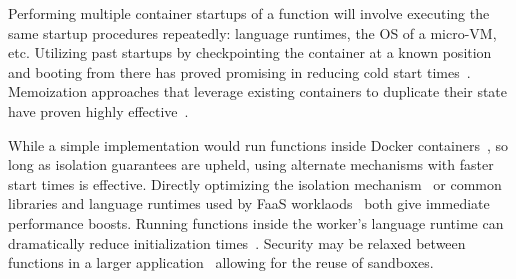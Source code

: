 Performing multiple container startups of a function will involve executing the same startup procedures repeatedly: language runtimes, the OS of a micro-VM, etc.
Utilizing past startups by checkpointing the container at a known position and booting from there has proved promising in reducing cold start times~\cite{du2020catalyzer,vhive-asplos21}.
Memoization approaches that leverage existing containers to duplicate their state have proven highly effective~\cite{du2020catalyzer,wei2022booting}.

While a simple implementation would run functions inside Docker containers~\cite{docker-main}, so long as isolation guarantees are upheld, using alternate mechanisms with faster start times is effective.
Directly optimizing the isolation mechanism~\cite{firecracker-nsdi20} or common libraries and language runtimes used by FaaS worklaods~\cite{carreira2021warm} both give immediate performance boosts. 
Running functions inside the worker's language runtime can dramatically reduce initialization times~\cite{vhive-asplos21,shillaker2020faasm,jia2021nightcore,du2020catalyzer}.
Security may be relaxed between functions in a larger application~\cite{akkus_sand_2018, dukic2020photons} allowing for the reuse of sandboxes.
%

